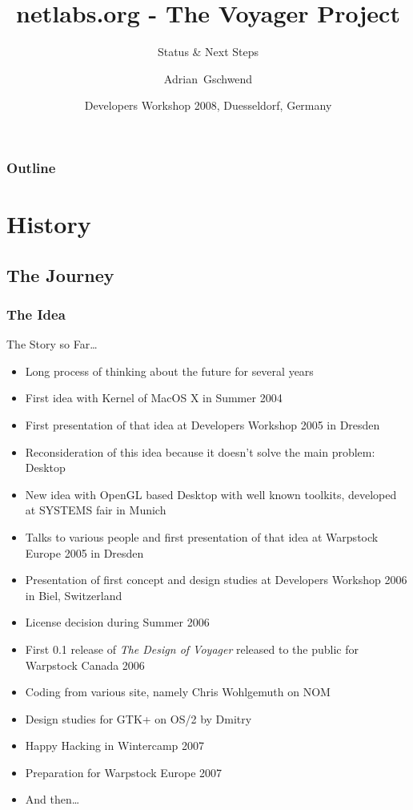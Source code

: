 \documentclass{beamer}
\title[netlabs.org - The Voyager Project]
{netlabs.org - The Voyager Project}
\subtitle
{Status \& Next Steps}
\author[Adrian Gschwend]
{Adrian~Gschwend}
\institute[netlabs.org]
{
netlabs.org - Open Source Software
}
\date[18.05.2008]
{Developers Workshop 2008, Duesseldorf, Germany}
\begin{document}
\begin{frame}
\titlepage
\end{frame}

\begin{frame}
\frametitle{Outline}
\tableofcontents[hideallsubsections]
\end{frame}

\section{History}

\subsection{The Journey}
\begin{frame}[allowframebreaks=0.6]
\frametitle{The Idea}
The Story so Far\ldots
\begin{itemize}
  \item Long process of thinking about the future for several years
  \item First idea with Kernel of MacOS X in Summer 2004
  \item First presentation of that idea at Developers Workshop 2005 in Dresden
  \item Reconsideration of this idea because it doesn't solve the main problem: Desktop
  \item New idea with OpenGL based Desktop with well known toolkits, developed at SYSTEMS fair in Munich
  \item Talks to various people and first presentation of that idea at
  Warpstock Europe 2005 in Dresden
  \item Presentation of first concept and design studies at Developers
  Workshop 2006 in Biel, Switzerland
  \item License decision during Summer 2006
  \item First 0.1 release of \textit{The Design of Voyager} released to the
  public for Warpstock Canada 2006
  \item Coding from various site, namely Chris Wohlgemuth on NOM
  \item Design studies for GTK+ on OS/2 by Dmitry
  \item Happy Hacking in Wintercamp 2007
  \item Preparation for Warpstock Europe 2007
  \item And then\ldots 
\end{itemize}
\end{frame}
\end{document}
